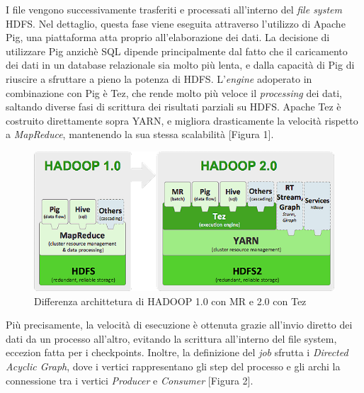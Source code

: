 \documentclass[12pt, a4paper, twocolumn]{article} %
\begin{document}

I file vengono successivamente trasferiti e processati all'interno del \textit{file system} HDFS. Nel dettaglio, questa fase viene eseguita attraverso l'utilizzo di Apache Pig, una piattaforma atta proprio all'elaborazione dei dati. La decisione di utilizzare Pig anzichè SQL dipende principalmente dal fatto che il caricamento dei dati in un database relazionale sia molto più lenta, e dalla capacità di Pig di riuscire a sfruttare a pieno la potenza di HDFS.
L'\textit{engine} adoperato in combinazione con Pig è Tez, che rende molto più veloce il \textit{processing} dei dati, saltando diverse fasi di scrittura dei risultati parziali su HDFS.
Apache Tez è costruito direttamente sopra YARN, e migliora drasticamente la velocità rispetto a \textit{MapReduce}, mantenendo la sua stessa scalabilità [Figura 1]. 

\begin{figure}
	\centering
	\includegraphics{hadoop2.png}
	\caption{Differenza archittetura di HADOOP 1.0 con MR e 2.0 con Tez}
\end{figure}

Più precisamente, la velocità di esecuzione è ottenuta grazie all'invio diretto dei dati da un processo all'altro, evitando la scrittura all'interno del file system, eccezion fatta per i checkpoints. Inoltre, la definizione del \textit{job} sfrutta i \textit{Directed Acyclic Graph}, dove i vertici rappresentano gli step del processo e gli archi la connessione tra i vertici \textit{Producer} e \textit{Consumer} [Figura 2].
\end{document}
